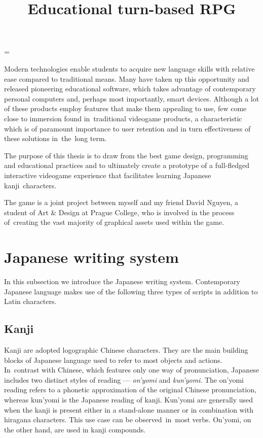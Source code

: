 \documentclass[thesis=B,english,hidelinks]{FITthesisXE}[2012/06/26]
\title{Educational turn-based RPG}
\begin{document}

\begin{introduction}

\emergencystretch=\maxdimen
{}

Modern technologies enable students to acquire new language skills with relative ease compared to traditional means. Many have taken up this opportunity and released pioneering educational software, which takes advantage of contemporary personal computers and, perhaps most importantly, smart devices. Although a lot of these products employ features that make them appealing to use, few come close to immersion found in~traditional videogame products, a characteristic which is of paramount importance to user retention and in turn effectiveness of these solutions in~the~long term.

The purpose of this thesis is to draw from the best game design, programming and educational practices and to ultimately create a prototype of a full-fledged interactive videogame experience that facilitates learning Japanese kanji~characters.

The game is a joint project between myself and my friend David Nguyen\autocite{nguyen}, a student of Art \& Design at Prague College, who is involved in the process of~creating the vast majority of graphical assets used within the game.

\section{Japanese writing system}

In this subsection we introduce the Japanese writing system. Contemporary Japanese language makes use of the following three types of scripts in addition to Latin characters.

\subsection{Kanji}

Kanji are adopted logographic Chinese characters. They are the main building blocks of Japanese language used to refer to most objects and actions. In~contrast with Chinese, which features only one way of pronunciation, Japanese includes two distinct styles of reading --- \emph{on'yomi} and \emph{kun'yomi}\autocite{literacy}. The on'yomi reading refers to a phonetic approximation of the original Chinese pronunciation, whereas kun'yomi is the Japanese reading of kanji. Kun'yomi are generally used when the kanji is present either in a stand-alone manner or in combination with hiragana characters. This use case can be observed~in~most verbs. On'yomi, on the other hand, are used in kanji compounds.


\end{introduction}
\end{document}
